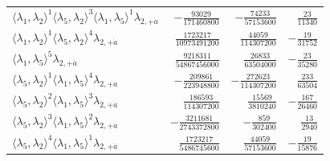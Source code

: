 \begin{longtable}{@{}lrrr@{}}
$\langle\lambda_1,\lambda_2\rangle^{1}\langle\lambda_5,\lambda_2\rangle^{3}\langle\lambda_1,\lambda_5\rangle^{1}\lambda_{2,+\dot a}$ & $-\frac{93029}{171460800}$ & $-\frac{74233}{57153600}$ & $\frac{23}{11340}$ \\
$\langle\lambda_1,\lambda_2\rangle^{1}\langle\lambda_5,\lambda_2\rangle^{4}\lambda_{2,+\dot a}$ & $\frac{1723217}{10973491200}$ & $\frac{44059}{114307200}$ & $-\frac{19}{31752}$ \\
$\langle\lambda_1,\lambda_5\rangle^{5}\lambda_{2,+\dot a}$ & $\frac{9218311}{54867456000}$ & $\frac{26833}{63504000}$ & $-\frac{23}{35280}$ \\
$\langle\lambda_5,\lambda_2\rangle^{1}\langle\lambda_1,\lambda_5\rangle^{4}\lambda_{2,+\dot a}$ & $-\frac{209861}{223948800}$ & $-\frac{272623}{114307200}$ & $\frac{233}{63504}$ \\
$\langle\lambda_5,\lambda_2\rangle^{2}\langle\lambda_1,\lambda_5\rangle^{3}\lambda_{2,+\dot a}$ & $\frac{186593}{114307200}$ & $\frac{15569}{3810240}$ & $-\frac{167}{26460}$ \\
$\langle\lambda_5,\lambda_2\rangle^{3}\langle\lambda_1,\lambda_5\rangle^{2}\lambda_{2,+\dot a}$ & $-\frac{3211681}{2743372800}$ & $-\frac{859}{302400}$ & $\frac{13}{2940}$ \\
$\langle\lambda_5,\lambda_2\rangle^{4}\langle\lambda_1,\lambda_5\rangle^{1}\lambda_{2,+\dot a}$ & $\frac{1723217}{5486745600}$ & $\frac{44059}{57153600}$ & $-\frac{19}{15876}$ \\
\end{longtable}
